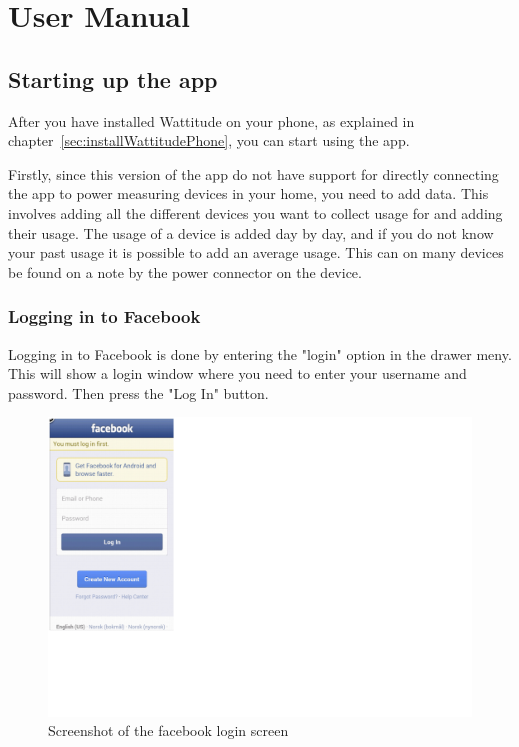 \chapter{User Manual}

\section{Starting up the app}
After you have installed Wattitude on your phone, as explained in chapter~\ref{sec:installWattitudePhone}, you can start using the app. 

Firstly, since this version of the app do not have support for directly connecting the app to power measuring devices in your home, you need to add data. This involves adding all the different devices you want to collect usage for and adding their usage. The usage of a device is added day by day, and if you do not know your past usage it is possible to add an average usage. This can on many devices be found on a note by the power connector on the device.

\subsection{Logging in to Facebook}
Logging in to Facebook is done by entering the "login" option in the drawer meny. This will show a login window where you need to enter your username and password. Then press the "Log In" button. 

\begin{figure}[H]
\includegraphics[width=\textwidth, clip]{appendix/usermanual/fig/Facebooklogin.png}
\caption{Screenshot of the facebook login screen}
\end{figure}

